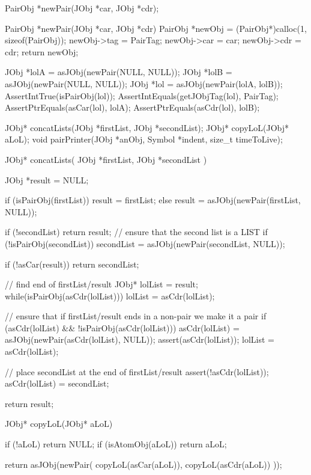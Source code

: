 \startTestSuite[newPair]

\startCHeader
PairObj *newPair(JObj *car, JObj *cdr);
\stopCHeader

\startCCode
PairObj *newPair(JObj *car, JObj *cdr) {
  PairObj *newObj =
    (PairObj*)calloc(1, sizeof(PairObj));
  newObj->tag = PairTag;
  newObj->car = car;
  newObj->cdr = cdr;
  return newObj;
}
\stopCCode


\startCTest
  JObj *lolA = asJObj(newPair(NULL, NULL));
  JObj *lolB = asJObj(newPair(NULL, NULL));
  JObj *lol  = asJObj(newPair(lolA, lolB));
  AssertIntTrue(isPairObj(lol));
  AssertIntEquals(getJObjTag(lol), PairTag);
  AssertPtrEquals(asCar(lol), lolA);
  AssertPtrEquals(asCdr(lol), lolB);  
\stopCTest
\stopTestCase
\stopTestSuite

\startCHeader
JObj* concatLists(JObj *firstList, JObj *secondList);
JObj* copyLoL(JObj* aLoL);
void pairPrinter(JObj *anObj, Symbol *indent, size_t timeToLive);
\stopCHeader

\startCCode
JObj* concatLists(
  JObj *firstList,
  JObj *secondList
) {
  JObj *result = NULL;
 
  if (isPairObj(firstList)) {
    result = firstList;
  } else {
    result = asJObj(newPair(firstList, NULL));
  }
 
  if (!secondList) return result;
  // ensure that the second list is a LIST
  if (!isPairObj(secondList)) {
    secondList = asJObj(newPair(secondList, NULL));
  }

  if (!asCar(result)) return secondList;
 
  // find end of firstList/result
  JObj* lolList = result;
  while(isPairObj(asCdr(lolList))) {
    lolList = asCdr(lolList);
  }

  // ensure that if firstList/result ends in a non-pair we make it a pair
  if (asCdr(lolList) && !isPairObj(asCdr(lolList))) {
    asCdr(lolList) = asJObj(newPair(asCdr(lolList), NULL));
    assert(asCdr(lolList));
    lolList = asCdr(lolList);
  }

  // place secondList at the end of firstList/result
  assert(!asCdr(lolList));
  asCdr(lolList) = secondList;
 
  return result;
}

JObj* copyLoL(JObj* aLoL) {
  if (!aLoL) return NULL;
  if (isAtomObj(aLoL)) return aLoL;

  return asJObj(newPair(
    copyLoL(asCar(aLoL)),
    copyLoL(asCdr(aLoL))
  ));
}

